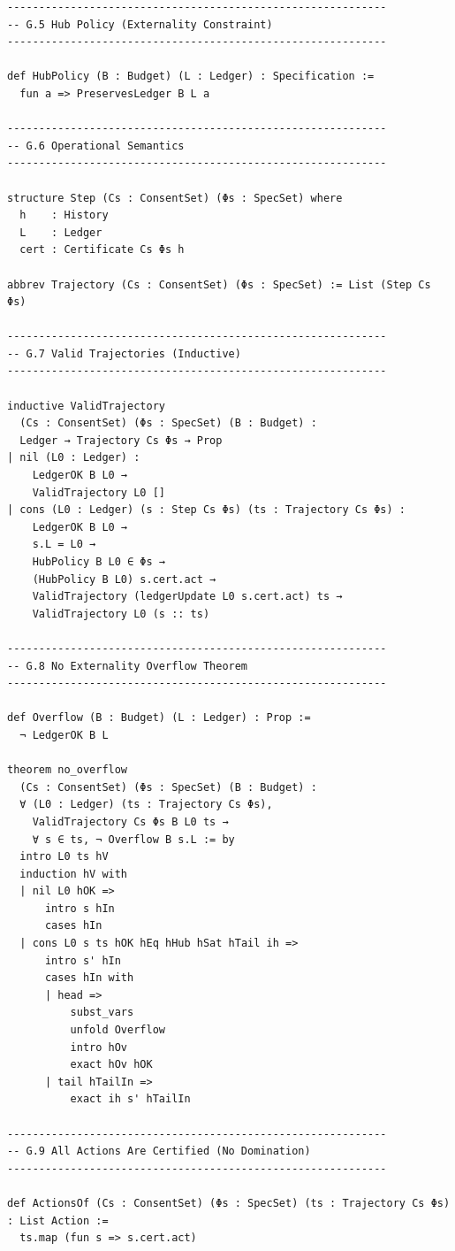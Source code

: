 \documentclass[11pt,oneside]{article}
\begin{document}
\begin{verbatim}
------------------------------------------------------------
-- G.5 Hub Policy (Externality Constraint)
------------------------------------------------------------

def HubPolicy (B : Budget) (L : Ledger) : Specification :=
  fun a => PreservesLedger B L a

------------------------------------------------------------
-- G.6 Operational Semantics
------------------------------------------------------------

structure Step (Cs : ConsentSet) (Φs : SpecSet) where
  h    : History
  L    : Ledger
  cert : Certificate Cs Φs h

abbrev Trajectory (Cs : ConsentSet) (Φs : SpecSet) := List (Step Cs Φs)

------------------------------------------------------------
-- G.7 Valid Trajectories (Inductive)
------------------------------------------------------------

inductive ValidTrajectory
  (Cs : ConsentSet) (Φs : SpecSet) (B : Budget) :
  Ledger → Trajectory Cs Φs → Prop
| nil (L0 : Ledger) :
    LedgerOK B L0 →
    ValidTrajectory L0 []
| cons (L0 : Ledger) (s : Step Cs Φs) (ts : Trajectory Cs Φs) :
    LedgerOK B L0 →
    s.L = L0 →
    HubPolicy B L0 ∈ Φs →
    (HubPolicy B L0) s.cert.act →
    ValidTrajectory (ledgerUpdate L0 s.cert.act) ts →
    ValidTrajectory L0 (s :: ts)

------------------------------------------------------------
-- G.8 No Externality Overflow Theorem
------------------------------------------------------------

def Overflow (B : Budget) (L : Ledger) : Prop :=
  ¬ LedgerOK B L

theorem no_overflow
  (Cs : ConsentSet) (Φs : SpecSet) (B : Budget) :
  ∀ (L0 : Ledger) (ts : Trajectory Cs Φs),
    ValidTrajectory Cs Φs B L0 ts →
    ∀ s ∈ ts, ¬ Overflow B s.L := by
  intro L0 ts hV
  induction hV with
  | nil L0 hOK =>
      intro s hIn
      cases hIn
  | cons L0 s ts hOK hEq hHub hSat hTail ih =>
      intro s' hIn
      cases hIn with
      | head =>
          subst_vars
          unfold Overflow
          intro hOv
          exact hOv hOK
      | tail hTailIn =>
          exact ih s' hTailIn

------------------------------------------------------------
-- G.9 All Actions Are Certified (No Domination)
------------------------------------------------------------

def ActionsOf (Cs : ConsentSet) (Φs : SpecSet) (ts : Trajectory Cs Φs) : List Action :=
  ts.map (fun s => s.cert.act)


\end{verbatim}
\end{document}
